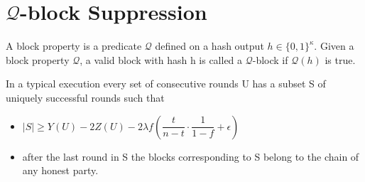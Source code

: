 \section{$\mathcal{Q}$-block Suppression}
\begin{definition}
    \cite{dionyziz}
    A block property is a predicate $\mathcal{Q}$ defined on a hash output $h \in \{ 0, 1 \}^\kappa$. Given  a block property $\mathcal{Q}$, a valid block with hash h is called a $\mathcal{Q}$-block if $\mathcal{Q}(h)$ is true.
\end{definition}

\begin{lemma}[Unsuppressibility]\cite{dionyziz}
    In a typical execution every set of consecutive rounds U has a subset S of uniquely successful rounds such that
    \begin{itemize}
        \item $\lvert S \rvert \geq Y(U) - 2Z(U) - 2 \lambda f (\dfrac{t}{n-t} \cdot \dfrac{1}{1-f} + \epsilon)$
        \item after the last round in S the blocks corresponding to S belong to the chain of any honest party.
    \end{itemize}
\end{lemma}

